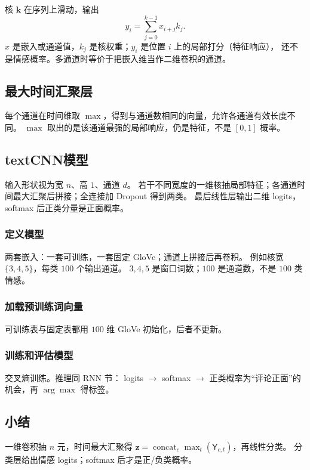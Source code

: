 核 $\bm{k}$ 在序列上滑动，输出
\[
y_i=\sum_{j=0}^{k-1}x_{i+j}k_j.
\]
$x$ 是嵌入或通道值，$k_j$ 是核权重；$y_i$ 是位置 $i$ 上的局部打分（特征响应），
还不是情感概率。多通道时等价于把嵌入维当作二维卷积的通道。

\subsection{最大时间汇聚层}

每个通道在时间维取 $\max$，得到与通道数相同的向量，允许各通道有效长度不同。
$\max$ 取出的是该通道最强的局部响应，仍是特征，不是 $[0,1]$ 概率。

\subsection{textCNN模型}

输入形状视为宽 $n$、高 $1$、通道 $d$。
若干不同宽度的一维核抽局部特征；各通道时间最大汇聚后拼接；全连接加 Dropout 得到两类。
最后线性层输出二维 logits，softmax 后正类分量是正面概率。

\subsubsection{定义模型}

两套嵌入：一套可训练，一套固定 GloVe；通道上拼接后再卷积。
例如核宽 $\{3,4,5\}$，每类 $100$ 个输出通道。
$3,4,5$ 是窗口词数；$100$ 是通道数，不是 $100$ 类情感。

\subsubsection{加载预训练词向量}

可训练表与固定表都用 $100$ 维 GloVe 初始化，后者不更新。

\subsubsection{训练和评估模型}

交叉熵训练。推理同 RNN 节：
logits $\to$ softmax $\to$ 正类概率为“评论正面”的机会，再 $\arg\max$ 得标签。

\subsection{小结}

一维卷积抽 $n$ 元，时间最大汇聚得
$\bm{z}=\operatorname{concat}_c\max_t(\mathsf{Y}_{c,t})$，再线性分类。
分类层给出情感 logits；softmax 后才是正/负类概率。

